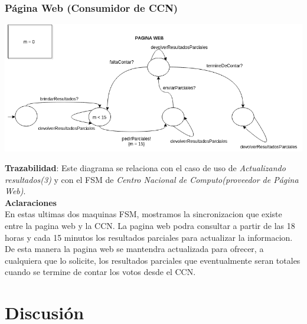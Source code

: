 \documentclass[spanish, 10pt,a4paper]{article}
\numberwithin{equation}{section} %
\begin{document}
\subsubsection{Página Web (Consumidor de CCN)}
\vspace{\baselineskip}
    \begin{center}
                \includegraphics[scale=0.50]{imagenes/fsm/FSMWeb2.png}
                \\
                \vspace{1pt}
                \footnotesize\textit{}
        \end{center}
\vspace{\baselineskip}
\vspace{-10px}
\noindent\textbf{Trazabilidad}: Este diagrama se relaciona con el caso de uso de \textit{Actualizando resultados(3)} y con el FSM de \textit{Centro Nacional de Computo(proveedor de Página Web)}.\\

\noindent\textbf{Aclaraciones}\\

En estas ultimas dos maquinas FSM, mostramos la sincronizacion que existe entre la pagina web y la CCN. La pagina web podra consultar a partir de las 18 horas y cada 15 minutos los resultados parciales para actualizar la informacion. De esta manera la pagina web se mantendra actualizada para ofrecer, a cualquiera que lo solicite, los resultados parciales que eventualmente seran totales cuando se termine de contar los votos desde el CCN.
\par 
\section{Discusión}
\end{document}
